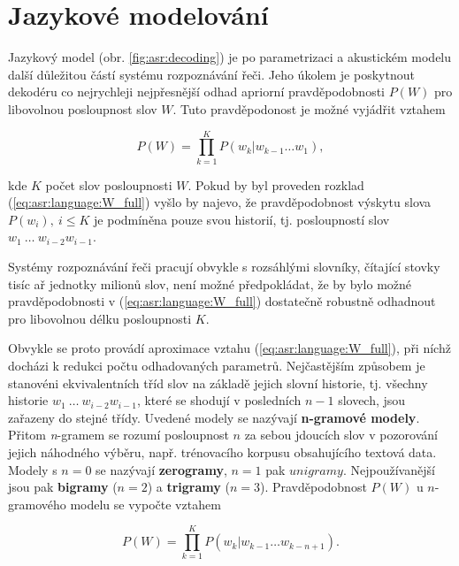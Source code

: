 \section{Jazykové modelování}
\label{chap:asr:language}

Jazykový model (obr. \ref{fig:asr:decoding}) je po parametrizaci a akustickém modelu další důležitou částí systému rozpoznávání řeči. Jeho úkolem je poskytnout dekodéru co nejrychleji nejpřesnější odhad apriorní pravděpodobnosti $P\left(W\right)$ pro libovolnou posloupnost slov $W$. Tuto pravděpodonost je možné vyjádřit vztahem

\begin{equation}
  P\left(W\right) = \prod_{k=1}^{K} P\left(w_k | w_{k-1}\dots w_{1}\right),
  \label{eq:asr:language:W_full}
\end{equation}

\noindent kde $K$ počet slov posloupnosti $W$. Pokud by byl proveden rozklad (\ref{eq:asr:language:W_full}) vyšlo by najevo, že pravděpodobnost výskytu slova $P\left(w_i\right),\ i \leq K$ je podmíněna pouze svou historií, tj. posloupností slov $w_1\ \dots\ w_{i-2}w_{i-1}$.

Systémy rozpoznávání řeči pracují obvykle s rozsáhlými slovníky, čítající stovky tisíc ař jednotky milionů slov, není možné předpokládat, že by bylo možné pravděpodobnosti v (\ref{eq:asr:language:W_full}) dostatečně robustně odhadnout pro libovolnou délku posloupnosti $K$.

Obvykle se proto provádí aproximace vztahu (\ref{eq:asr:language:W_full}), při níchž docházi k redukci počtu odhadovaných parametrů. Nejčastějším způsobem je stanovéni ekvivalentních tříd slov na základě jejich slovní historie, tj. všechny historie $w_1\ \dots\ w_{i-2}w_{i-1}$, které se shodují v posledních $n-1$ slovech, jsou zařazeny do stejné třídy. Uvedené modely se nazývají \textbf{n-gramové modely}. Přitom \textit{n}-gramem se rozumí posloupnost $n$ za sebou jdoucích slov v pozorování jejich náhodného výběru, např. trénovacího korpusu obsahujícího textová data. Modely s $n=0$ se nazývají \textbf{zerogramy}, $n=1$ pak $unigramy$. Nejpoužívanější jsou pak \textbf{bigramy} ($n=2$) a \textbf{trigramy} ($n=3$). Pravděpodobnost $P\left(W\right)$ u $n$-gramového modelu se vypočte vztahem

\begin{equation}
  P\left(W\right) = \prod_{k=1}^{K} P\left(w_k | w_{k-1}\dots w_{k-n+1}\right).
  \label{eq:asr:language:W}
\end{equation}

